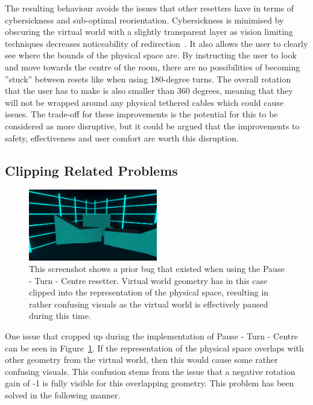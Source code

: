 The resulting behaviour avoids the issues that other resetters have in terms of cybersickness and sub-optimal reorientation. Cybersickness is minimised by obscuring the virtual world with a slightly transparent layer as vision limiting techniques decreases noticeability of redirection~\cite{sra2018vmotion}. It also allows the user to clearly see where the bounds of the physical space are. By instructing the user to look and move towards the centre of the room, there are no possibilities of becoming ''stuck'' between resets like when using 180-degree turns. The overall rotation that the user has to make is also smaller than 360 degrees, meaning that they will not be wrapped around any physical tethered cables which could cause issues. The trade-off for these improvements is the potential for this to be considered as more disruptive, but it could be argued that the improvements to safety, effectiveness and user comfort are worth this disruption.

\subsection{Clipping Related Problems}
\begin{figure}[htbp]
  \centering
  \includegraphics[width=0.5\textwidth]{figures/screenshots/pauseTurnCentreClipping.png}
  \caption[Pause - Turn - Centre Clipping Bug Screenshot]{This screenshot shows a prior bug that existed when using the Pause - Turn - Centre resetter. Virtual world geometry has in this case clipped into the representation of the physical space, resulting in rather confusing visuals as the virtual world is effectively paused during this time.}
  \label{fig:pauseTurnCentreClippingBug}
\end{figure}

One issue that cropped up during the implementation of Pause - Turn - Centre can be seen in Figure~\ref{fig:pauseTurnCentreClippingBug}. If the representation of the physical space overlaps with other geometry from the virtual world, then this would cause some rather confusing visuals. This confusion stems from the issue that a negative rotation gain of -1 is fully visible for this overlapping geometry. This problem has been solved in the following manner.

